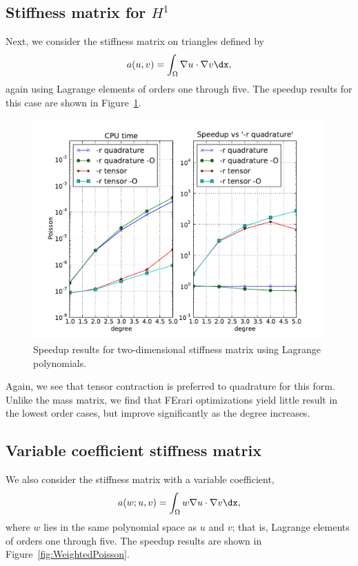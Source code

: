 \subsection{Stiffness matrix for $H^1$}

Next, we consider the stiffness matrix on triangles defined by
\begin{equation}
  a(u, v) = \int_{\Omega} \nabla u \cdot \nabla v \dx,
\end{equation}
again using Lagrange elements of orders one through five. The speedup
results for this case are shown in Figure~\ref{fig:Poisson}.

\begin{figure}
\bwfig
  \centering
  \includegraphics[width=\largefig]{chapters/kirby-3/pdf/Poisson.pdf}
  \caption{Speedup results for two-dimensional stiffness matrix using Lagrange polynomials.}
  \label{fig:Poisson}
\end{figure}

Again, we see that tensor contraction is preferred to quadrature for
this form. Unlike the mass matrix, we find that FErari optimizations
yield little result in the lowest order cases, but improve
significantly as the degree increases.

\subsection{Variable coefficient stiffness matrix}

We also consider the stiffness matrix with a variable coefficient,
\begin{equation}
  a(w; u, v) = \int_{\Omega} w \nabla u \cdot \nabla v \dx,
\end{equation}
where $ w $ lies in the same polynomial space as $ u $ and $ v$; that
is, Lagrange elements of orders one through five. The speedup results
are shown in Figure~\ref{fig:WeightedPoisson}.

